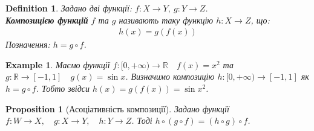 \documentclass[a4paper, 14pt]{article}
\theoremstyle{theoremdd}
\theoremstyle{theoremdd}
\newtheorem{definition}[theorem]{Definition}
\theoremstyle{theoremdd}
\theoremstyle{theoremdd}
\newtheorem{example}[theorem]{Example}
\theoremstyle{theoremdd}
\newtheorem{proposition}[theorem]{Proposition}
\theoremstyle{theoremdd}
\theoremstyle{theoremdd}
\theoremstyle{theoremdd}
\begin{document}
	\begin{definition}
	Задано дві функції: $f \colon X \to Y,\ g \colon Y \to Z$.\\
	\textbf{Композицією функцій} $f$ та $g$ називають таку функцію $h \colon X \to Z$, що:
	\begin{align*}
	h(x) = g(f(x))
	\end{align*}
	Позначення: $h = g \circ f$.
	\begin{figure}[H]
\end{figure}
	\end{definition}
	
	\begin{example}
	Маємо функції $f \colon [0,+\infty) \to \mathbb{R} \quad f(x) = x^2$ та $g \colon \mathbb{R} \to [-1,1] \quad g(x) = \sin x$. Визначимо композицію $h \colon [0,+\infty) \to [-1,1]$ як $h = g \circ f$. Тобто звідси $h(x) = g(f(x)) = \sin x^2$.
	\end{example}
	
	\begin{proposition}[Асоціативність композиції]
	Задано функції $f \colon W \to X, \quad g \colon X \to Y, \quad h \colon Y \to Z$. Тоді $h \circ (g \circ f) = (h \circ g) \circ f$.
	\end{proposition}
	
\end{document}
